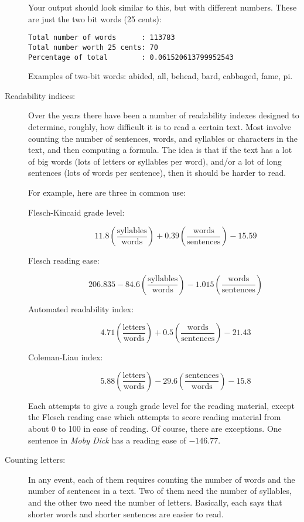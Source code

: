 \documentclass[12pt]{article}
\begin{document}
\begin{description}
Your output should look similar to this, but with different numbers.
These are just the two bit words (25 cents):

\begin{lstlisting}
Total number of words      : 113783
Total number worth 25 cents: 70
Percentage of total        : 0.061520613799952543
\end{lstlisting}

Examples of two-bit words: abided, all, behead, bard, cabbaged, fame, pi.


\item[Readability indices:]  Over the years there have been 
a number of readability indexes designed to determine,
roughly, how difficult it is to read a certain text.
Most involve counting the number of sentences, words, and
syllables or characters in the text, and then computing
a formula.  The idea is that if the text has a lot of
big words (lots of letters or syllables per word),
and/or a lot of long sentences (lots of words per
sentence), then it should be harder to read.

For example, here are three in common use:
\begin{description}
\item[Flesch-Kincaid grade level:] 
\[ 
  11.8\left(\frac{\mbox{syllables}}{\mbox{words}}\right)
 + 0.39\left(\frac{\mbox{words}}{\mbox{sentences}}\right)
 - 15.59 \]
\item[Flesch reading ease:]
\[
206.835 
  - 84.6\left(\frac{\mbox{syllables}}{\mbox{words}}\right)
- 1.015\left(\frac{\mbox{words}}{\mbox{sentences}}\right)
  \]
 \item[Automated readability index:]
 \[ 4.71\left(\frac{\mbox{letters}}{\mbox{words}}\right)
  + 0.5\left(\frac{\mbox{words}}{\mbox{sentences}}\right)
  -21.43 \]
  \item[Coleman-Liau index:]
  \[
  5.88\left(\frac{\mbox{letters}}{\mbox{words}}\right)
  - 29.6\left(\frac{\mbox{sentences}}{\mbox{words}}\right)
  - 15.8\]
\end{description}
Each attempts to give a rough grade level for the reading
material, except the Flesch reading ease which attempts to 
score reading material from about 0 to 100 in ease of reading.
Of course, there are exceptions.  One sentence in {\em Moby Dick}
has a reading ease of $-146.77$.

\item[Counting letters:]
In any event, each of them requires counting the number of words
and the number of sentences in a text.  Two of them need the number
of syllables, and the other two need the number of letters.
Basically, each says that shorter words and shorter sentences
are easier to read.


\end{description}
\end{document}
